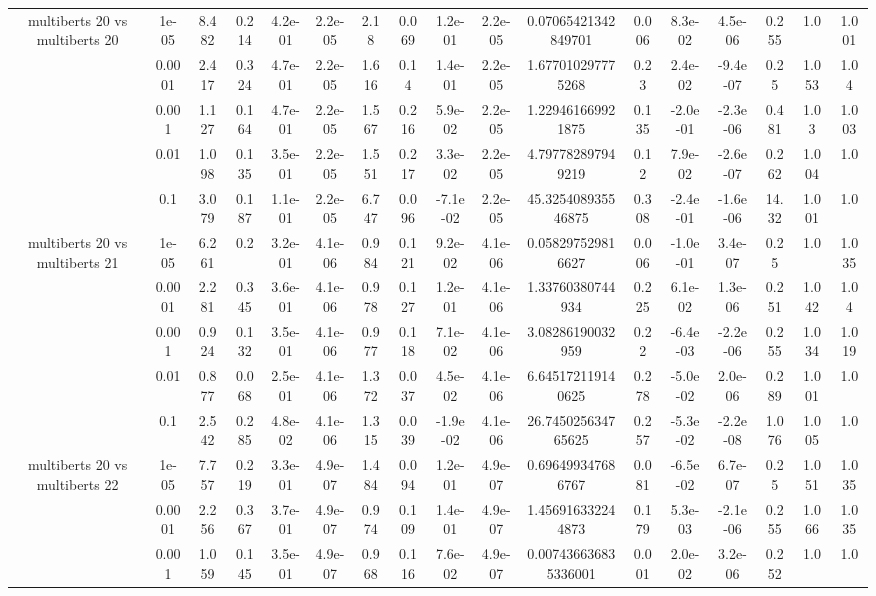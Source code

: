 \begin{tabular}{|c|c|c|c|c|c|c|c|c|c|c|c|c|c|c|c|c|}
\hline
\multirow{5}{*}{multiberts 20 vs multiberts 20} & 1e-05 & 8.482 & 0.214 & 4.2e-01 & 2.2e-05 & 2.18 & 0.069 & 1.2e-01 & 2.2e-05 & 0.07065421342849701 & 0.006 & 8.3e-02 & 4.5e-06 & 0.255 & 1.0 & 1.001 \\
 & 0.0001 & 2.417 & 0.324 & 4.7e-01 & 2.2e-05 & 1.616 & 0.14 & 1.4e-01 & 2.2e-05 & 1.677010297775268 & 0.23 & 2.4e-02 & -9.4e-07 & 0.25 & 1.053 & 1.04 \\
 & 0.001 & 1.127 & 0.164 & 4.7e-01 & 2.2e-05 & 1.567 & 0.216 & 5.9e-02 & 2.2e-05 & 1.229461669921875 & 0.135 & -2.0e-01 & -2.3e-06 & 0.481 & 1.03 & 1.003 \\
 & 0.01 & 1.098 & 0.135 & 3.5e-01 & 2.2e-05 & 1.551 & 0.217 & 3.3e-02 & 2.2e-05 & 4.797782897949219 & 0.12 & 7.9e-02 & -2.6e-07 & 0.262 & 1.004 & 1.0 \\
 & 0.1 & 3.079 & 0.187 & 1.1e-01 & 2.2e-05 & 6.747 & 0.096 & -7.1e-02 & 2.2e-05 & 45.325408935546875 & 0.308 & -2.4e-01 & -1.6e-06 & 14.32 & 1.001 & 1.0 \\
\hline
\multirow{5}{*}{multiberts 20 vs multiberts 21} & 1e-05 & 6.261 & 0.2 & 3.2e-01 & 4.1e-06 & 0.984 & 0.121 & 9.2e-02 & 4.1e-06 & 0.058297529816627 & 0.006 & -1.0e-01 & 3.4e-07 & 0.25 & 1.0 & 1.035 \\
 & 0.0001 & 2.281 & 0.345 & 3.6e-01 & 4.1e-06 & 0.978 & 0.127 & 1.2e-01 & 4.1e-06 & 1.33760380744934 & 0.225 & 6.1e-02 & 1.3e-06 & 0.251 & 1.042 & 1.04 \\
 & 0.001 & 0.924 & 0.132 & 3.5e-01 & 4.1e-06 & 0.977 & 0.118 & 7.1e-02 & 4.1e-06 & 3.08286190032959 & 0.22 & -6.4e-03 & -2.2e-06 & 0.255 & 1.034 & 1.019 \\
 & 0.01 & 0.877 & 0.068 & 2.5e-01 & 4.1e-06 & 1.372 & 0.037 & 4.5e-02 & 4.1e-06 & 6.645172119140625 & 0.278 & -5.0e-02 & 2.0e-06 & 0.289 & 1.001 & 1.0 \\
 & 0.1 & 2.542 & 0.285 & 4.8e-02 & 4.1e-06 & 1.315 & 0.039 & -1.9e-02 & 4.1e-06 & 26.745025634765625 & 0.257 & -5.3e-02 & -2.2e-08 & 1.076 & 1.005 & 1.0 \\
\hline
\multirow{5}{*}{multiberts 20 vs multiberts 22} & 1e-05 & 7.757 & 0.219 & 3.3e-01 & 4.9e-07 & 1.484 & 0.094 & 1.2e-01 & 4.9e-07 & 0.696499347686767 & 0.081 & -6.5e-02 & 6.7e-07 & 0.25 & 1.051 & 1.035 \\
 & 0.0001 & 2.256 & 0.367 & 3.7e-01 & 4.9e-07 & 0.974 & 0.109 & 1.4e-01 & 4.9e-07 & 1.456916332244873 & 0.179 & 5.3e-03 & -2.1e-06 & 0.255 & 1.066 & 1.035 \\
 & 0.001 & 1.059 & 0.145 & 3.5e-01 & 4.9e-07 & 0.968 & 0.116 & 7.6e-02 & 4.9e-07 & 0.007436636835336001 & 0.001 & 2.0e-02 & 3.2e-06 & 0.252 & 1.0 & 1.0 \\

\end{tabular}
